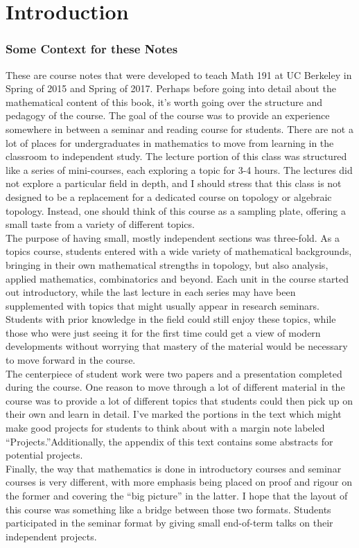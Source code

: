 \chapter{Introduction}
\subsection*{Some Context for these Notes}
These are course notes that were developed to teach  Math 191 at UC Berkeley in Spring of 2015 and Spring of 2017. Perhaps before going into detail about the mathematical content of this book, it's worth going over the structure and pedagogy of the course.  The goal of the course was to provide an experience somewhere in between a seminar and reading course for students. There are not a lot of places for undergraduates in mathematics to move from learning in the classroom to independent study. The lecture portion of this class was structured like a series of mini-courses, each exploring a topic for 3-4 hours. The lectures did not explore a particular field in depth, and I should stress that this class is not designed to be a replacement for a dedicated course on topology or algebraic topology. Instead, one should think of this course as a sampling plate, offering a small taste from a variety of different topics.\\
The purpose of having small, mostly independent sections was three-fold.
 As a topics course, students entered with a wide variety of mathematical backgrounds, bringing in their own mathematical strengths in topology, but also analysis, applied mathematics, combinatorics and beyond. Each unit in the course started out introductory, while the last lecture in each series may have been supplemented with topics that might usually appear in research seminars. Students with prior knowledge in the field could still enjoy these topics, while those who were just seeing it for the first time could get a view of modern developments without worrying that mastery of the material would be necessary to move forward in the course. \\
 The centerpiece of student work were two papers and a presentation completed during the course. One reason to move through a lot of different material in the course was to provide a lot of different topics that students could then pick up on their own and learn in detail. I've marked the portions in the text which might make good projects for students to think about with a margin note labeled ``Projects.''\project Additionally, the appendix of this text contains some abstracts for potential projects.\\
 Finally, the way that mathematics is done in introductory courses and seminar courses is very different, with more emphasis being placed on proof and rigour on the former and covering the ``big picture'' in the latter. I hope that the layout of this course was something like a bridge between those two formats. Students participated in the seminar format by giving small end-of-term talks on their independent projects. 

